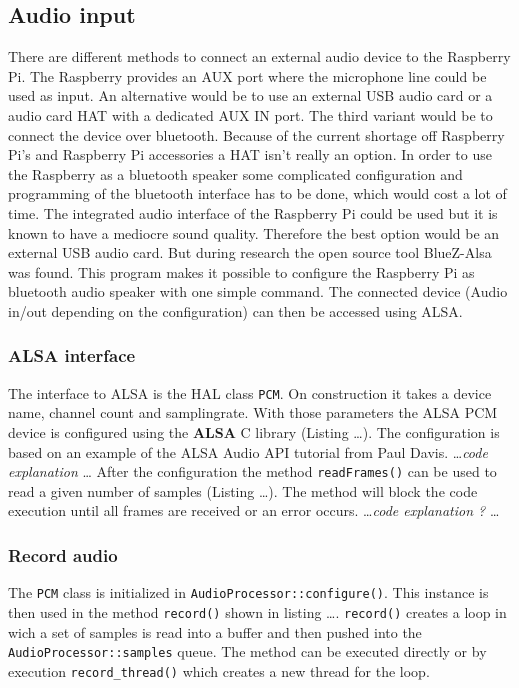\subsection{Audio input}\label{sec:software:rec}
%
There are different methods to connect an external audio device to the Raspberry Pi. The Raspberry provides an AUX port where the microphone line could be used as input. An alternative would be to use an external USB audio card or a audio card HAT with a dedicated AUX IN port. The third variant would be to connect the device over bluetooth.\p
%
Because of the current shortage off Raspberry Pi's and Raspberry Pi accessories a HAT isn't really an option. In order to use the Raspberry as a bluetooth speaker some complicated configuration and programming of the bluetooth interface has to be done, which would cost a lot of time. The integrated audio interface of the Raspberry Pi could be used but it is known to have a mediocre sound quality. Therefore the best option would be an external USB audio card. But during research the open source tool BlueZ-Alsa\cite{bokowy_bluez-alsa_2022} was found. This program makes it possible to configure the Raspberry Pi as bluetooth audio speaker with one simple command. The connected device (Audio in/out depending on the configuration) can then be accessed using ALSA.
%
\subsubsection*{ALSA interface}

The interface to ALSA is the HAL class \lstinline{PCM}. On construction it takes a device name, channel count and samplingrate. With those parameters the ALSA PCM device is configured using the \textbf{ALSA} C library (Listing \dots).\cite{noauthor_alsa_nodate} The configuration is based on an example of the ALSA Audio API tutorial from Paul Davis.\cite{davis_tutorial_nodate}\p
%
\dots \textit{code explanation} \dots\p
%
After the configuration the method \lstinline{readFrames()} can be used to read a given number of samples (Listing \dots). The method will block the code execution until all frames are received or an error occurs.
%
\dots \textit{code explanation ?} \dots
%
\subsubsection*{Record audio}
%
The \lstinline{PCM} class is initialized in \lstinline{AudioProcessor::configure()}. This instance is then used in the method \lstinline{record()} shown in listing \dots. \lstinline{record()} creates a loop in wich a set of samples is read into a buffer and then pushed into the \lstinline{AudioProcessor::samples} queue. The method can be executed directly or by execution \lstinline{record_thread()} which creates a new thread for the loop.